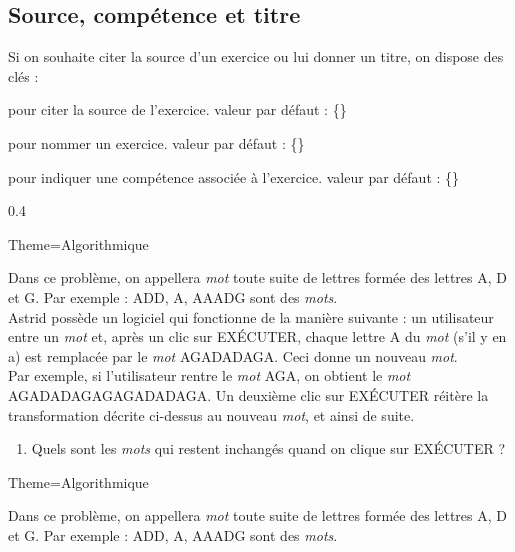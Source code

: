 \documentclass[12pt,french]{article}
\newcommand\Cle[1]{%
  {\sffamily\textlangle #1\textrangle}%
}%
\newcommand{\Defaut}[1]{%
\hfill valeur par défaut : {\sffamily #1}\par%
}%
\newenvironment{Description}
               {\list{}{\labelwidth0pt \leftmargin0pt \itemindent-\leftmargin
                        \let\makelabel\Descriptionlabel}}
               {\endlist}
\newcommand*\Descriptionlabel[1]{\hspace\labelsep
                                \normalfont\bfseries #1}
\begin{document}
\subsection*{Source, compétence et titre}
Si on souhaite citer la source d'un exercice ou lui donner un titre, on dispose des clés :
\begin{Description}
\item[La clé \Cle{Source}] pour citer la source de l'exercice.\Defaut{\{\}}
\item[La clé \Cle{Titre}] pour nommer un exercice.\Defaut{\{\}}
\item[La clé \Cle{Competence}] pour indiquer une compétence associée à l'exercice.\Defaut{\{\}}
\begin{Codes}{0.4}{}
\begin{Maquette}[Fiche]{Theme=Algorithmique}
  \begin{exercice}[Source=Olympiades 2019,Titre=Modifier des mots,Competence=Raisonner]
    Dans ce problème, on appellera {\em mot} toute suite de lettres formée des lettres A, D et G. Par exemple : ADD, A, AAADG sont des {\em mots}.
    \\Astrid possède un logiciel qui fonctionne de la manière suivante : un utilisateur entre un {\em mot} et, après un clic sur EXÉCUTER, chaque lettre A du {\em mot} (s'il y en a) est remplacée par le {\em mot} AGADADAGA. Ceci donne un nouveau {\em mot}.\\Par exemple, si l'utilisateur rentre le {\em mot} AGA, on obtient le {\em mot} AGADADAGAGAGADADAGA. Un deuxième clic sur EXÉCUTER réitère la transformation décrite ci-dessus au nouveau {\em mot}, et ainsi de suite.
    \begin{enumerate}
    \item Quels sont les {\em mots} qui restent inchangés quand on clique sur EXÉCUTER ?
    \end{enumerate}
\end{exercice}
\end{Maquette}
\end{Codes}
\begin{Maquette}[Fiche]{Theme=Algorithmique}
  \begin{exercice}[Source=Olympiades 2019,Titre=Modifier des mots,Competence=Raisonner]
    Dans ce problème, on appellera {\em mot} toute suite de lettres formée des lettres A, D et G. Par exemple : ADD, A, AAADG sont des {\em mots}.

\end{exercice}
\end{Maquette}
\end{Description}
\end{document}
